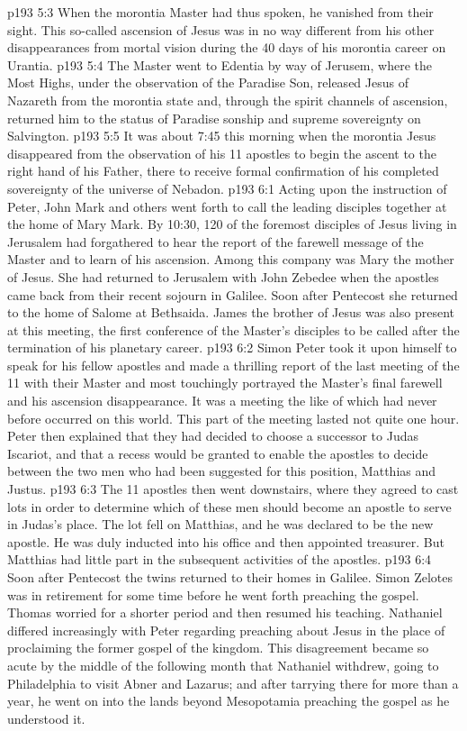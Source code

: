 \vs p193 5:3 \pc When the morontia Master had thus spoken, he vanished from their sight. This so\hyp{}called ascension of Jesus was in no way different from his other disappearances from mortal vision during the 40 days of his morontia career on Urantia.
\vs p193 5:4 The Master went to Edentia by way of Jerusem, where the Most Highs, under the observation of the Paradise Son, released Jesus of Nazareth from the morontia state and, through the spirit channels of ascension, returned him to the status of Paradise sonship and supreme sovereignty on Salvington.
\vs p193 5:5 It was about 7:45 this morning when the morontia Jesus disappeared from the observation of his 11 apostles to begin the ascent to the right hand of his Father, there to receive formal confirmation of his completed sovereignty of the universe of Nebadon.
\vs p193 6:1 Acting upon the instruction of Peter, John Mark and others went forth to call the leading disciples together at the home of Mary Mark. By 10:30, 120 of the foremost disciples of Jesus living in Jerusalem had forgathered to hear the report of the farewell message of the Master and to learn of his ascension. Among this company was Mary the mother of Jesus. She had returned to Jerusalem with John Zebedee when the apostles came back from their recent sojourn in Galilee. Soon after Pentecost she returned to the home of Salome at Bethsaida. James the brother of Jesus was also present at this meeting, the first conference of the Master’s disciples to be called after the termination of his planetary career.
\vs p193 6:2 Simon Peter took it upon himself to speak for his fellow apostles and made a thrilling report of the last meeting of the 11 with their Master and most touchingly portrayed the Master’s final farewell and his ascension disappearance. It was a meeting the like of which had never before occurred on this world. This part of the meeting lasted not quite one hour. Peter then explained that they had decided to choose a successor to Judas Iscariot, and that a recess would be granted to enable the apostles to decide between the two men who had been suggested for this position, Matthias and Justus.
\vs p193 6:3 The 11 apostles then went downstairs, where they agreed to cast lots in order to determine which of these men should become an apostle to serve in Judas’s place. The lot fell on Matthias, and he was declared to be the new apostle. He was duly inducted into his office and then appointed treasurer. But Matthias had little part in the subsequent activities of the apostles.
\vs p193 6:4 \pc Soon after Pentecost the twins returned to their homes in Galilee. Simon Zelotes was in retirement for some time before he went forth preaching the gospel. Thomas worried for a shorter period and then resumed his teaching. Nathaniel differed increasingly with Peter regarding preaching about Jesus in the place of proclaiming the former gospel of the kingdom. This disagreement became so acute by the middle of the following month that Nathaniel withdrew, going to Philadelphia to visit Abner and Lazarus; and after tarrying there for more than a year, he went on into the lands beyond Mesopotamia preaching the gospel as he understood it.
